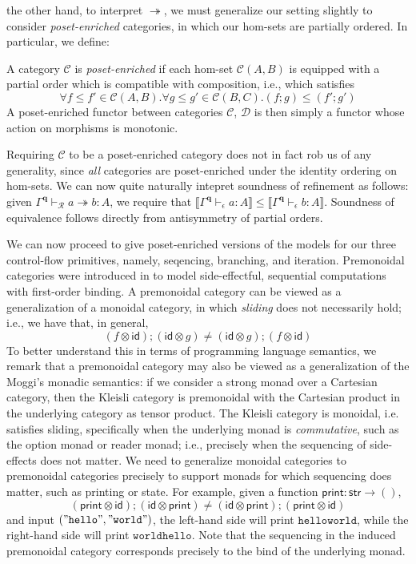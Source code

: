 \documentclass[acmsmall,screen,review]{acmart}
\newcommand{\mc}[1]{\ensuremath{\mathcal{#1}}}
\newcommand{\mb}[1]{\ensuremath{\mathbf{#1}}}
\newcommand{\ms}[1]{\ensuremath{\mathsf{#1}}}
\newcommand{\hasty}[4]{#1 \vdash_{#2} #3: {#4}}
\newcommand{\tref}{\twoheadrightarrow}
\newcommand{\tmle}[5]{#1 \vdash_{#2} #3 \tref #4 : {#5}}
\newcommand{\dnt}[1]{\llbracket{#1}\rrbracket}
\begin{document}
the other hand, to interpret $\tref$, we must generalize our setting slightly to consider
\emph{poset-enriched} categories, in which our hom-sets are partially ordered. In particular, we
define:
\begin{definition}
  A category $\mc{C}$ is \emph{poset-enriched} if each hom-set $\mc{C}(A, B)$ is equipped with a
  partial order which is compatible with composition, i.e., which satisfies
  $$
  \forall f \leq f' \in \mc{C}(A, B) . \forall g \leq g' \in \mc{C}(B, C) . (f ; g) \leq (f' ; g')
  $$
  A poset-enriched functor between categories $\mc{C}$, $\mc{D}$ is then simply a functor whose
  action on morphisms is monotonic.
\end{definition}
Requiring $\mc{C}$ to be a poset-enriched category does not in fact rob us of any generality, since
\emph{all} categories are poset-enriched under the identity ordering on hom-sets. We can now quite
naturally intepret soundness of refinement as follows: given
$\tmle{\Gamma^{\mb{q}}}{\mc{R}}{a}{b}{A}$, we require that
$\dnt{\hasty{\Gamma^{\mb{q}}}{\epsilon}{a}{A}} \leq \dnt{\hasty{\Gamma^{\mb{q}}}{\epsilon}{b}{A}}$.
Soundness of equivalence follows directly from antisymmetry of partial orders.

We can now proceed to give poset-enriched versions of the models for our three control-flow
primitives, namely, seqencing, branching, and iteration. Premonoidal categories were introduced in
\citet{power-premonoidal-97} to model side-effectful, sequential computations with first-order
binding. A premonoidal category can be viewed as a generalization of a monoidal category, in which
\emph{sliding} does not necessarily hold; i.e., we have that, in general,
$$
(f \otimes \ms{id}) ; (\ms{id} \otimes g) \neq
(\ms{id} \otimes g) ; (f \otimes \ms{id})
$$
To better understand this in terms of programming language semantics, we remark that a premonoidal
category may also be viewed as a generalization of the Moggi's \cite{moggi-91-monad} monadic
semantics: if we consider a strong monad over a Cartesian category, then the Kleisli category is
premonoidal with the Cartesian product in the underlying category as tensor product. The Kleisli
category is monoidal, i.e. satisfies sliding, specifically when the underlying monad is
\emph{commutative}, such as the option monad or reader monad; i.e., precisely when the sequencing of
side-effects does not matter. We need to generalize monoidal categories to premonoidal categories
precisely to support monads for which sequencing does matter, such as printing or state. For
example, given a function $\ms{print}: \ms{str} \to ()$,
$$
(\ms{print} \otimes \ms{id}) ; (\ms{id} \otimes \ms{print}) \neq
(\ms{id} \otimes \ms{print}) ; (\ms{print} \otimes \ms{id}) 
$$
and input $(\mathtt{"hello"}, \mathtt{"world"})$, the left-hand side will print $\mathtt{hello
world}$, while the right-hand side will print $\mathtt{world hello}$. Note that the sequencing in
the induced premonoidal category corresponds precisely to the bind of the underlying monad.
\end{document}
